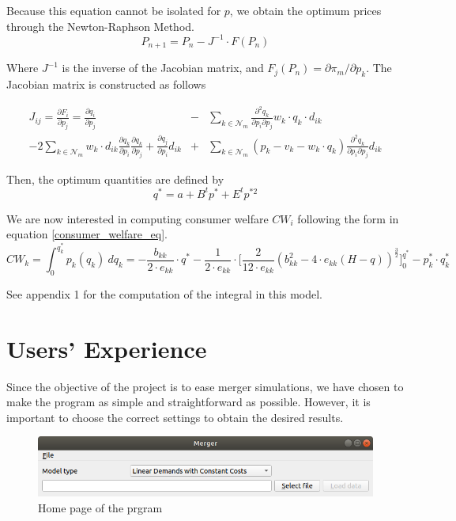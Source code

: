 \documentclass[12pt]{article}
\begin{document}
Because this equation cannot be isolated for $p$, we obtain the optimum prices through the Newton-Raphson Method.
\begin{equation*}
P_{n+1} = P_n - J^{-1} \cdot F(P_n)
\end{equation*}

Where $J^{-1}$ is the inverse of the Jacobian matrix, and $F_j(P_n) = \partial \pi_m / \partial p_k$. The Jacobian matrix is constructed as follows

\begin{eqnarray*}
J_{ij} = \frac{\partial F_i}{\partial p_j} = \frac{\partial q_i}{\partial p_j} &-& \sum_{k \in \mathcal{N}_m} \frac{\partial^2 q_k}{\partial p_i \partial p_j} w_k \cdot q_k \cdot d_{ik}\\
 - 2\sum_{k \in \mathcal{N}_m} w_k \cdot d_{ik} \frac{\partial q_k}{\partial p_i} \frac{\partial q_k}{\partial p_j} + \frac{\partial q_j}{\partial p_i} d_{ik} &+& \sum_{k \in \mathcal{N}_m} (p_k - v_k - w_k \cdot q_k) \frac{\partial^2 q_k}{\partial p_i \partial p_j}d_{ik}
\end{eqnarray*}

Then, the optimum quantities are defined by 
\begin{equation*}
q^* = a + B^t p^* + E^t p^{*2}
\end{equation*}

We are now interested in computing consumer welfare $CW_i$ following the form in equation \ref{consumer_welfare_eq}.
\begin{equation*}
CW_k = \int_0^{q_k^*} p_k(q_k) \ dq_k = -\frac{b_{kk}}{2 \cdot e_{kk}} \cdot q^* -\frac{1}{2 \cdot e_{kk}} \cdot \bigg[\frac{2}{12 \cdot e_{kk}} (b_{kk}^2 - 4 \cdot e_{kk}(H - q))^{\frac{3}{2}}\bigg]_0^{q^*} - p_k^* \cdot q_k^*
\end{equation*}

See appendix 1 for the computation of the integral in this model.  

\section{Users' Experience}

Since the objective of the project is to ease merger simulations, we have chosen to make the program as simple and straightforward as possible. However, it is important to choose the correct settings to obtain the desired results.
\begin{figure}
\begin{center}
  \includegraphics[width=10 cm]{home}
\caption{\label{home}Home page of the prgram}
\end{center}
\end{figure}
\end{document}
